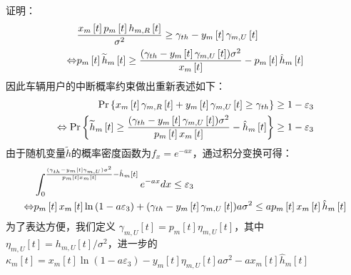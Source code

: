 证明：
\begin{align} \label{E4-15}
&\frac{x_m\left[t\right]p_m\left[t\right]h_{m,R}\left[t\right]}{\sigma^2}\geq \gamma_{th}-y_m\left[t\right]\gamma_{m,U}\left[t\right] \\
\Leftrightarrow
&p_m\left[t\right]{\widetilde{h}}_{m}\left[t\right]\geq \frac{{(\gamma_{th}-y_m\left[t\right]\gamma_{m,U}\left[t\right])\sigma^2}}{x_m\left[t\right]}
-p_m\left[t\right]{\hat{h}}_{m}\left[t\right]   \notag
\end{align}
因此车辆用户的中断概率约束做出重新表述如下：
\begin{align} \label{E4-16}
\Pr\left\{x_m\left[t\right]\gamma_{m,R}\left[t\right]+y_m\left[t\right]\gamma_{m,U}\left[t\right] \geq \gamma_{th}\right\}\geq1-\varepsilon_3    \\
\Leftrightarrow
\Pr\left\{{\widetilde{h}}_{m}\left[t\right]\geq \frac{{(\gamma_{th}-y_m\left[t\right]\gamma_{m,U}\left[t\right])\sigma^2}}{p_m\left[t\right]x_m\left[t\right]}
-{\hat{h}}_{m}\left[t\right]\right\}\geq1-\varepsilon_3                          \notag
\end{align}
由于随机变量$\widetilde{h}$的概率密度函数为$f_x={{e}^{-ax}}$，通过积分变换可得：
\begin{align} \label{E4-17}
&\int_{0}^{\frac{{(\gamma_{th}-y_m\left[t\right]\gamma_{m,U})\sigma^2}}{p_m\left[t\right]x_m\left[t\right]}
-{\hat{h}}_{m}\left[t\right]}{e^{-ax}dx}\le \varepsilon_3 \\
\Leftrightarrow
&p_m\left[t\right]x_m\left[t\right]\ln \left(1-a \varepsilon_3\right)+(\gamma_{th}-y_m\left[t\right]\gamma_{m,U}\left[t\right]) a \sigma^2
\leq a p_m\left[t\right]x_m\left[t\right]\hat{h}_{m}\left[t\right]   \notag
\end{align}
为了表达方便，我们定义
$\gamma_{m,U}\left[t\right]=p_m\left[t\right]\eta_{m,U}\left[t\right]$，其中$\eta_{m,U}\left[t\right]=h_{m,U}\left[t\right]/{\sigma^2}$，进一步的
${{\kappa }_{m}}\left[ t \right]={{x}_{m}}\left[ t \right]\ln \left( 1-a{{\varepsilon }_{3}} \right)-{{y}_{m}}\left[ t \right]{{\eta }_{m,U}}\left[ t \right]a{{\sigma }^{2}}-a{{x}_{m}}\left[ t \right]{{\hat{h}}_{m}}\left[ t \right]$

